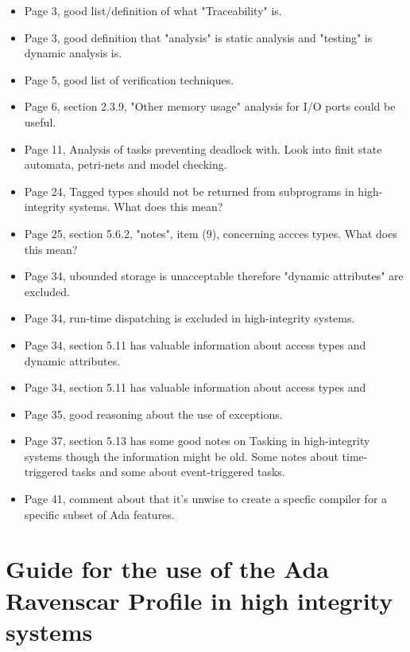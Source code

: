 \begin{itemize}
    \item Page 3, good list/definition of what "Traceability" is.
    \item Page 3, good definition that "analysis" is static analysis and
        "testing" is dynamic analysis is.
    \item Page 5, good list of verification techniques.
    \item Page 6, section 2.3.9, "Other memory usage" analysis for I/O ports
        could be useful.
    \item Page 11, Analysis of tasks preventing deadlock with. Look into finit
        state automata, petri-nets and model checking.
    \item Page 24, Tagged types should not be returned from subprograms in
        high-integrity systems. What does this mean?
    \item Page 25, section 5.6.2, "notes", item (9), concerning accces types.
        What does this mean?
    \item Page 34, ubounded storage is unacceptable therefore "dynamic
        attributes" are excluded.
    \item Page 34, run-time dispatching is excluded in high-integrity systems.
    \item Page 34, section 5.11 has valuable information about access types and
        dynamic attributes.
    \item Page 34, section 5.11 has valuable information about access types and
    \item Page 35, good reasoning about the use of exceptions.
    \item Page 37, section 5.13 has some good notes on Tasking in
        high-integrity systems though the information might be old. Some notes
        about time-triggered tasks and some about event-triggered tasks.
    \item Page 41, comment about that it's unwise to create a specfic compiler
        for a specific subset of Ada features.
\end{itemize}

\section{Guide for the use of the Ada Ravenscar Profile in high integrity
systems}

